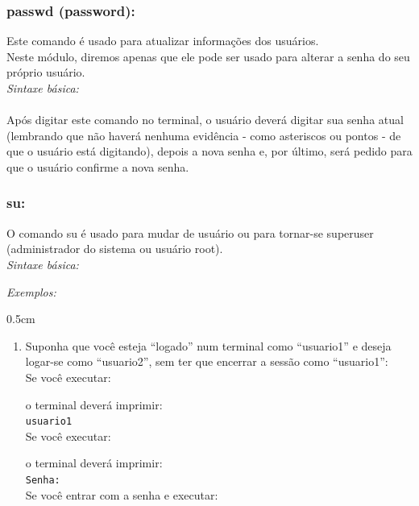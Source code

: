 \begin{refsection}
\subsubsection{passwd (password):}\label{tut1:text_mode:commands:passwd}

Este comando é usado para atualizar informações dos usuários.\\
Neste módulo, diremos apenas que ele pode ser usado para alterar a senha do seu próprio usuário.\\

\textit{Sintaxe básica:}
\\
 \\
Após digitar este comando no terminal, o usuário deverá digitar sua senha atual (lembrando que não haverá nenhuma evidência - como asteriscos ou pontos - de que o usuário está digitando), depois a nova senha e, por último, será pedido para que o usuário confirme a nova senha.\\

\subsubsection{su:}\label{tut1:text_mode:commands:su}

O comando su é usado para mudar de usuário ou para tornar-se superuser (administrador do sistema ou usuário root).\\

\textit{Sintaxe básica:}
\\

\textit{Exemplos:}
\begin {myindentpar}{0.5cm}
\begin{enumerate}[\itshape i.]

\item{Suponha que você esteja ``logado'' num terminal como ``usuario1'' e deseja logar-se como ``usuario2'', sem ter que encerrar a sessão como ``usuario1'':}
\\
Se você executar:\\

o terminal deverá imprimir:\\
\indent\indent\texttt{usuario1}
\\
Se você executar:\\

o terminal deverá imprimir:\\
\indent\indent\texttt{Senha:}
\\
Se você entrar com a senha e  executar:\\


\end{enumerate}
\end{myindentpar}
\end{refsection}

